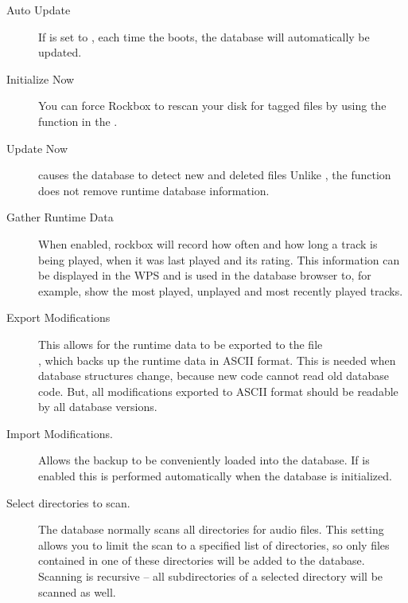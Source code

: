 \begin{description}
\item[Auto Update]
  If  is set to , each time the \dap{}
  boots, the database will automatically be updated.

\item[Initialize Now]
  You can force Rockbox to rescan your disk for tagged files by
  using the  function in the .

\item[Update Now]
   causes the database to detect new and deleted files
  Unlike , the  function
  does not remove runtime database information.
  
\item[Gather Runtime Data]
  When enabled, rockbox will record how often and how long a track is being played, 
  when it was last played and its rating. This information can be displayed in
  the WPS and is used in the database browser to, for example, show the most played, 
  unplayed and most recently played tracks.
  
\item[Export Modifications]
  This allows for the runtime data to be exported to the file \\
  , which backs up the runtime data in
  ASCII format. This is needed when database structures change, because new
  code cannot read old database code. But, all modifications
  exported to ASCII format should be readable by all database versions.
  
\item[Import Modifications.]
  Allows the  backup to be 
  conveniently loaded into the database. If  is
  enabled this is performed automatically when the database is initialized.

\item[Select directories to scan.]
  The database normally scans all directories for audio files. This setting
  allows you to limit the scan to a specified list of directories, so only
  files contained in one of these directories will be added to the database.
  Scanning is recursive -- all subdirectories of a selected directory will
  be scanned as well.

\end{description}

